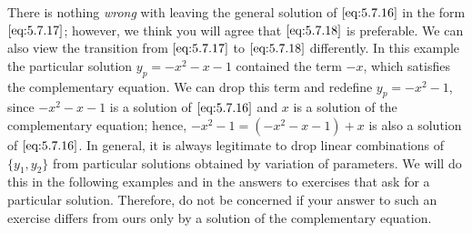 \documentclass{ximera}
\begin{document}
There is nothing \textit{wrong} with leaving the general solution of
$\eqref{eq:5.7.16}$ in the form $\eqref{eq:5.7.17}$; however, we think
you will agree that $\eqref{eq:5.7.18}$ is preferable. We can also view the
transition from $\eqref{eq:5.7.17}$ to $\eqref{eq:5.7.18}$ differently. In this example the particular solution $y_p=-x^2-x-1$ contained the term
$-x$, which satisfies the complementary equation. We can
 drop this term and redefine $y_p=-x^2-1$, since
 $-x^2-x-1$ is a solution of $\eqref{eq:5.7.16}$ and $x$ is a solution
of the complementary equation; hence, $-x^2-1=(-x^2-x-1)+x$
is also a solution of $\eqref{eq:5.7.16}$. In general, it is always legitimate to drop linear combinations of $\{y_1,y_2\}$ from
particular solutions obtained by variation of parameters.
We will do this in the following examples and in the answers to
exercises that ask for a particular solution. Therefore, do not be concerned if your answer to such an exercise differs from ours only by
a solution of the complementary equation.
 
\end{document}
